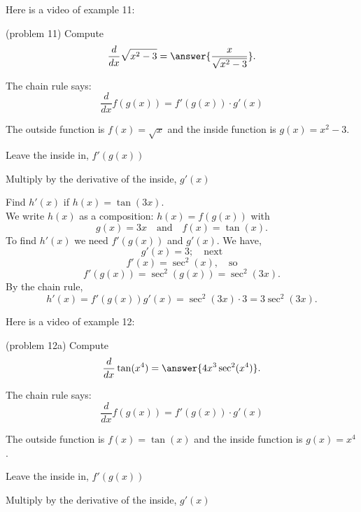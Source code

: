 \documentclass[handout]{ximera}
\begin{document}
Here is a video of example 11:
\begin{foldable}
\end{foldable}




\begin{problem}(problem 11)
  Compute
  \[
  \frac{d}{dx} \sqrt{x^2 - 3} = \answer{\frac{x}{\sqrt{x^2 - 3}}}.
  \]
  
    \begin{hint}
      The chain rule says:
      \[
      \frac{d}{dx} f(g(x)) = f'(g(x))\cdot g'(x)
      \]
    \end{hint}
    \begin{hint}
      The outside function is $f(x) = \sqrt{x}$ and the inside
      function is $g(x) = x^2 - 3$.
    \end{hint}
    
    \begin{hint}
		  Leave the inside in, $f'(g(x))$
		\end{hint}
		\begin{hint}
		  Multiply by the derivative of the inside, $g'(x)$
		\end{hint}
		
\end{problem}




\begin{example}[example 12]

Find $h'(x)$ if $h(x) = \tan(3x)$.\\
We write $h(x)$ as a composition: $h(x)=f(g(x))$ with 
\[
g(x) = 3x  \quad \text{and} \quad  f(x) =\tan(x).
\]
To find $h'(x)$ we need $f'(g(x))$ and $g'(x)$.  We have, 
\[
g'(x) =3; \quad \text{next} 
\]
\[
f'(x) =\sec^2(x) , \quad \text{so}
\]
\[
f'(g(x)) = \sec^2(g(x)) = \sec^2(3x).
\]
By the chain rule, 
\[
h'(x) = f'(g(x))g'(x) = \sec^2(3x) \cdot 3= 3\sec^2(3x).
\]
\end{example}


Here is a video of example 12:
\begin{foldable}
\end{foldable}



\begin{problem}(problem 12a)
  Compute
  \[
  \frac{d}{dx} \tan(x^4) = \answer{4x^3 \sec^2(x^4)}.
  \]
  
    \begin{hint}
      The chain rule says:
      \[
      \frac{d}{dx} f(g(x)) = f'(g(x))\cdot g'(x)
      \]
    \end{hint}
    \begin{hint}
      The outside function is $f(x) = \tan(x)$ and the inside
      function is $g(x) = x^4$.
    \end{hint}
    \begin{hint}
		  Leave the inside in, $f'(g(x))$
		\end{hint}
		\begin{hint}
		  Multiply by the derivative of the inside, $g'(x)$
		\end{hint}
 	
\end{problem}
\end{document}
